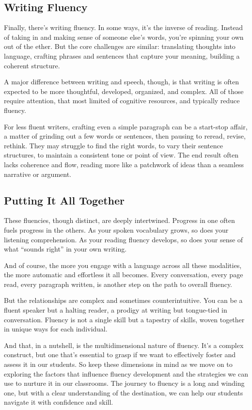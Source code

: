 \subsection{Writing Fluency}

Finally, there's writing fluency. In some ways, it's the inverse of reading. Instead of taking in and making sense of someone else's words, you're spinning your own out of the ether. But the core challenges are similar: translating thoughts into language, crafting phrases and sentences that capture your meaning, building a coherent structure.

A major difference between writing and speech, though, is that writing is often expected to be more thoughtful, developed, organized, and complex. All of those require attention, that most limited of cognitive resources, and typically reduce fluency.

For less fluent writers, crafting even a simple paragraph can be a start-stop affair, a matter of grinding out a few words or sentences, then pausing to reread, revise, rethink. They may struggle to find the right words, to vary their sentence structures, to maintain a consistent tone or point of view. The end result often lacks coherence and flow, reading more like a patchwork of ideas than a seamless narrative or argument.

\subsection{Putting It All Together}

These fluencies, though distinct, are deeply intertwined. Progress in one often fuels progress in the others. As your spoken vocabulary grows, so does your listening comprehension. As your reading fluency develops, so does your sense of what ``sounds right'' in your own writing.

And of course, the more you engage with a language across all these modalities, the more automatic and effortless it all becomes. Every conversation, every page read, every paragraph written, is another step on the path to overall fluency.

But the relationships are complex and sometimes counterintuitive. You can be a fluent speaker but a halting reader, a prodigy at writing but tongue-tied in conversation. Fluency is not a single skill but a tapestry of skills, woven together in unique ways for each individual.

And that, in a nutshell, is the multidimensional nature of fluency. It's a complex construct, but one that's essential to grasp if we want to effectively foster and assess it in our students. So keep these dimensions in mind as we move on to exploring the factors that influence fluency development and the strategies we can use to nurture it in our classrooms. The journey to fluency is a long and winding one, but with a clear understanding of the destination, we can help our students navigate it with confidence and skill.




